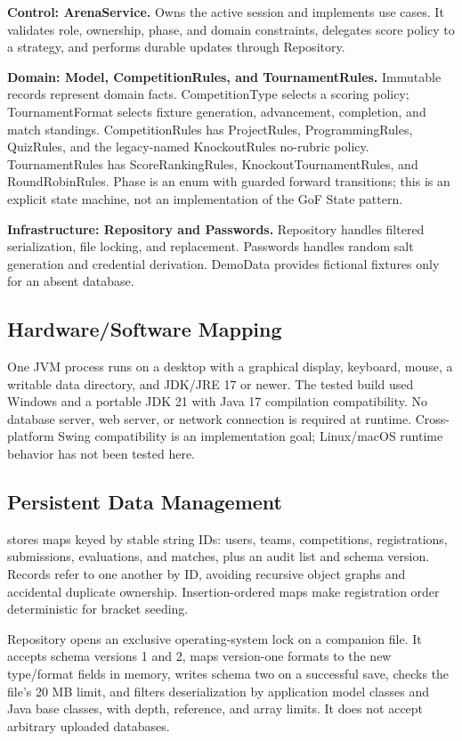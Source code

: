 \documentclass[12pt]{article}
\begin{document}
\textbf{Control: ArenaService.} Owns the active session and implements use cases. It validates role, ownership, phase, and domain constraints, delegates score policy to a strategy, and performs durable updates through Repository.

\textbf{Domain: Model, CompetitionRules, and TournamentRules.} Immutable records represent domain facts. CompetitionType selects a scoring policy; TournamentFormat selects fixture generation, advancement, completion, and match standings. CompetitionRules has ProjectRules, ProgrammingRules, QuizRules, and the legacy-named KnockoutRules no-rubric policy. TournamentRules has ScoreRankingRules, KnockoutTournamentRules, and RoundRobinRules. Phase is an enum with guarded forward transitions; this is an explicit state machine, not an implementation of the GoF State pattern.

\textbf{Infrastructure: Repository and Passwords.} Repository handles filtered serialization, file locking, and replacement. Passwords handles random salt generation and credential derivation. DemoData provides fictional fixtures only for an absent database.
\subsection{Hardware/Software Mapping}
One JVM process runs on a desktop with a graphical display, keyboard, mouse, a writable data directory, and JDK/JRE 17 or newer. The tested build used Windows and a portable JDK 21 with Java 17 compilation compatibility. No database server, web server, or network connection is required at runtime. Cross-platform Swing compatibility is an implementation goal; Linux/macOS runtime behavior has not been tested here.
\subsection{Persistent Data Management}
 stores maps keyed by stable string IDs: users, teams, competitions, registrations, submissions, evaluations, and matches, plus an audit list and schema version. Records refer to one another by ID, avoiding recursive object graphs and accidental duplicate ownership. Insertion-ordered maps make registration order deterministic for bracket seeding.

Repository opens an exclusive operating-system lock on a companion file. It accepts schema versions 1 and 2, maps version-one formats to the new type/format fields in memory, writes schema two on a successful save, checks the file's 20 MB limit, and filters deserialization by application model classes and Java base classes, with depth, reference, and array limits. It does not accept arbitrary uploaded databases.
\end{document}
